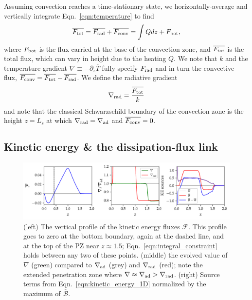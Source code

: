\documentclass{aastex631}
\newcommand{\gradrad}{\ensuremath{\nabla_{\rm{rad}}}}
\newcommand{\gradad}{\ensuremath{\nabla_{\rm{ad}}}}
\newcommand{\justgrad}{\ensuremath{\nabla}}
\newcommand{\Fbot}{\ensuremath{F_{\rm{bot}}}}
\newcommand{\Ftot}{\ensuremath{F_{\rm{tot}}}}
\newcommand{\Frad}{\ensuremath{F_{\rm{rad}}}}
\newcommand{\Fconv}{\ensuremath{F_{\rm{conv}}}}
\renewcommand{\bar}[1]{\overline{#1}}
\begin{document}
Assuming convection reaches a time-stationary state, we horizontally-average and vertically integrate Eqn.~\ref{eqn:temperature} to find
\begin{equation}
\overline{\Ftot} = \overline{\Frad} + \overline{\Fconv} = \int Q dz + \Fbot,
\label{eqn:flux_definition}
\end{equation}
where $\Fbot$ is the flux carried at the base of the convection zone, and $\overline{\Ftot}$ is the total flux, which can vary in height due to the heating $Q$.
We note that $k$ and the temperature gradient $\justgrad \equiv -\partial_z \bar{T}$ fully specify $\Frad$ and in turn the convective flux, $\bar{\Fconv} = \bar{\Ftot} - \bar{\Frad}$.
We define the radiative gradient 
\begin{equation}
\gradrad = \frac{\bar{\Ftot}}{k}
\label{eqn:gradrad_definition}
\end{equation}
and note that the classical Schwarzschild boundary of the convection zone is the height $z = L_s$ at which $\gradrad = \gradad$ and $\bar{\Fconv} = 0$.

\subsection{Kinetic energy \& the dissipation-flux link}
\label{sec:theory_energy}
\begin{figure}[t!]
\centering
\includegraphics[width=\textwidth]{theory_profiles.pdf}
\caption{
(left) The vertical profile of the kinetic energy fluxes $\mathcal{F}$.
This profile goes to zero at the bottom boundary, again at the dashed line, and at the top of the PZ near $z \approx 1.5$; Eqn.~\ref{eqn:integral_constraint} holds between any two of these points.
(middle) the evolved value of $\justgrad$ (green) compared to $\gradad$ (grey) and $\gradrad$ (red); note the extended penetration zone where $\justgrad \approx \gradad > \gradrad$.
(right) Source terms from Eqn.~\ref{eqn:kinetic_energy_1D} normalized by the maximum of $\overline{\mathcal{B}}$.
\label{fig:theory_profiles}
}
\end{figure}
\end{document}
